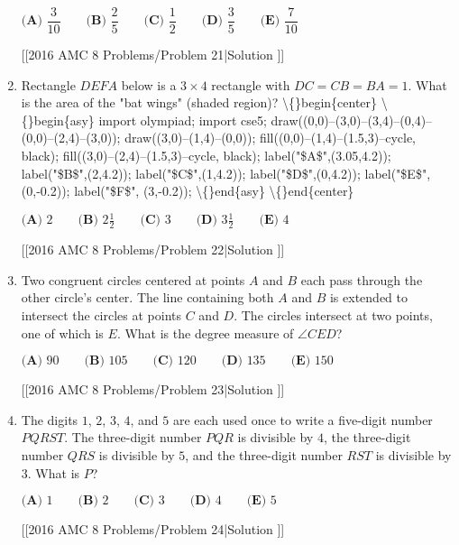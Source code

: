 \documentclass{article}
\begin{document}
\begin{enumerate}[label=\arabic*., itemsep=0.5em]
\(\textbf{(A) }\dfrac{3}{10}\qquad\textbf{(B) }\dfrac{2}{5}\qquad\textbf{(C) }\dfrac{1}{2}\qquad\textbf{(D) }\dfrac{3}{5}\qquad \textbf{(E) }\dfrac{7}{10}\)

[[2016 AMC 8 Problems/Problem 21|Solution
]]\par \vspace{0.5em}\item Rectangle \(DEFA\) below is a \(3 \times 4\) rectangle with \(DC=CB=BA=1\). What is the area of the "bat wings" (shaded region)?
\textbackslash\{\}begin\{center\}
\textbackslash\{\}begin\{asy\}
import olympiad;
import cse5;
draw((0,0)--(3,0)--(3,4)--(0,4)--(0,0)--(2,4)--(3,0));
draw((3,0)--(1,4)--(0,0));
fill((0,0)--(1,4)--(1.5,3)--cycle, black);
fill((3,0)--(2,4)--(1.5,3)--cycle, black);
label("\$A\$",(3.05,4.2));
label("\$B\$",(2,4.2));
label("\$C\$",(1,4.2));
label("\$D\$",(0,4.2));
label("\$E\$", (0,-0.2));
label("\$F\$", (3,-0.2));
\textbackslash\{\}end\{asy\}
\textbackslash\{\}end\{center\}


\(\textbf{(A) }2\qquad\textbf{(B) }2 \frac{1}{2}\qquad\textbf{(C) }3\qquad\textbf{(D) }3 \frac{1}{2}\qquad \textbf{(E) }4\)

[[2016 AMC 8 Problems/Problem 22|Solution
]]\par \vspace{0.5em}\item Two congruent circles centered at points \(A\) and \(B\) each pass through the other circle's center. The line containing both \(A\) and \(B\) is extended to intersect the circles at points \(C\) and \(D\). The circles intersect at two points, one of which is \(E\). What is the degree measure of \(\angle CED\)?

\(\textbf{(A) }90\qquad\textbf{(B) }105\qquad\textbf{(C) }120\qquad\textbf{(D) }135\qquad \textbf{(E) }150\)

[[2016 AMC 8 Problems/Problem 23|Solution
]]\par \vspace{0.5em}\item The digits \(1\), \(2\), \(3\), \(4\), and \(5\) are each used once to write a five-digit number \(PQRST\). The three-digit number \(PQR\) is divisible by \(4\), the three-digit number \(QRS\) is divisible by \(5\), and the three-digit number \(RST\) is divisible by \(3\). What is \(P\)?

\(\textbf{(A) }1\qquad\textbf{(B) }2\qquad\textbf{(C) }3\qquad\textbf{(D) }4\qquad \textbf{(E) }5\)

[[2016 AMC 8 Problems/Problem 24|Solution
]]


\end{enumerate}
\end{document}
